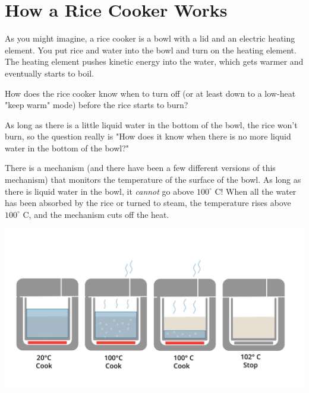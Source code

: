 \section{How a Rice Cooker Works}

As you might imagine,  a rice cooker is a bowl with a lid and an electric heating element.  You put rice and water into the bowl and turn on the heating element.   The heating element pushes kinetic energy into the water, which gets warmer and eventually starts to boil.

How does the rice cooker know when to turn off (or at least down to a low-heat "keep warm" mode) before the rice starts to burn?

As long  as there is a little liquid water in the bottom of the bowl, the rice won't burn, so the question really is "How does it know when there is no more liquid water in the bottom of the bowl?"

There is a mechanism (and there have been a few different versions of this mechanism)  that monitors the temperature of the surface of the bowl.  As long as there is liquid water in the bowl,  it \emph{cannot} go above $100^\circ$ C!  When all the water has been absorbed by the rice or turned to steam,  the temperature rises above $100^\circ$ C, and the mechanism cuts off the heat.

\includegraphics[width=0.9\linewidth]{riceCookerPhase.png}

